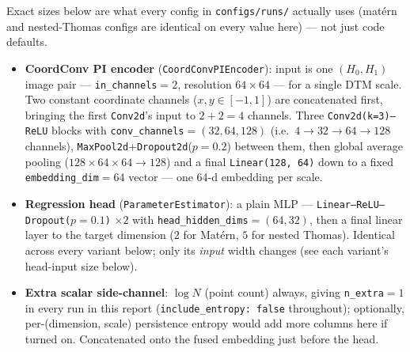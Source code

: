 \documentclass[11pt]{article}
\begin{document}
Exact sizes below are what every config in \texttt{configs/runs/} actually
uses (matérn and nested-Thomas configs are identical on every value here) — not
just code defaults.

\begin{itemize}
  \item \textbf{CoordConv PI encoder} (\texttt{CoordConvPIEncoder}): input is one
    $(H_0, H_1)$ image pair — \texttt{in\_channels}$=2$, resolution $64\times64$ —
    for a single DTM scale. Two constant coordinate channels ($x,y \in [-1,1]$)
    are concatenated first, bringing the first \texttt{Conv2d}'s input to
    $2+2=4$ channels. Three \texttt{Conv2d(k=3)--ReLU} blocks with
    \texttt{conv\_channels}$=(32, 64, 128)$ (i.e.\ $4\to32\to64\to128$ channels),
    \texttt{MaxPool2d}+\texttt{Dropout2d}($p=0.2$) between them, then global
    average pooling ($128\times64\times64 \to 128$) and a final
    \texttt{Linear(128, 64)} down to a fixed \texttt{embedding\_dim}$=64$ vector
    — one 64-d embedding per scale.
  \item \textbf{Regression head} (\texttt{ParameterEstimator}): a plain MLP —
    \texttt{Linear--ReLU--Dropout($p=0.1$)} $\times 2$ with
    \texttt{head\_hidden\_dims}$=(64, 32)$, then a final linear layer to the
    target dimension ($2$ for Matérn, $5$ for nested Thomas). Identical across
    every variant below; only its \emph{input} width changes (see each
    variant's head-input size below).
  \item \textbf{Extra scalar side-channel}: $\log N$ (point count) always,
    giving \texttt{n\_extra}$=1$ in every run in this report
    (\texttt{include\_entropy: false} throughout); optionally, per-(dimension,
    scale) persistence entropy would add more columns here if turned on.
    Concatenated onto the fused embedding just before the head.
\end{itemize}
\end{document}

